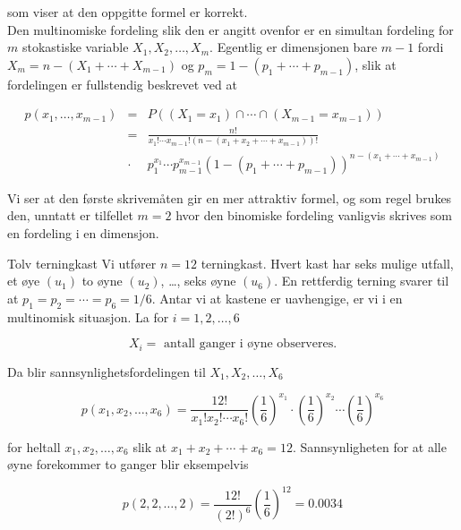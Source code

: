 \noindent som viser at den oppgitte formel er korrekt.\\

 Den multinomiske fordeling slik den er angitt
ovenfor er en simultan fordeling for $m$ stokastiske variable
$X_1, X_2, \ldots, X_m$. Egentlig er dimensjonen bare $m-1$ fordi
$X_m=n-(X_1+\cdots +X_{m-1})$ og $p_m=1-(p_1+\cdots +p_{m-1})$,
slik at fordelingen er fullstendig beskrevet ved at

\begin{eqnarray*}
 p(x_1,\ldots ,x_{m-1})&=&P((X_1=x_1)\cap \cdots \cap (X_{m-1}=x_{m-1})) \\
&=&\frac{n!}{x_1!\cdots x_{m-1}!(n-(x_1+x_2+\cdots +x_{m-1}))!} \\
& \cdot & p_1^{x_1}\cdots p_{m-1}^{x_{m-1}}{(1-(p_1+\cdots +p_{m-1}))}^{n-(x_1+\cdots +x_{m-1})}
\end{eqnarray*}

\noindent Vi ser at den første skrivemåten gir en mer attraktiv formel,
og som regel brukes den, unntatt er tilfellet $m=2$ hvor den
binomiske fordeling vanligvis skrives som en fordeling i en
dimensjon.\\

\begin{eksempel}{Tolv terningkast}
Vi utfører $n=12$ terningkast. Hvert kast har seks mulige utfall,
et øye $(u_1)$ to øyne $(u_2)$, \ldots, seks øyne $(u_6)$. En
rettferdig terning svarer til at $p_1=p_2=\cdots =p_6=1/6$. Antar
vi at kastene er uavhengige, er vi i en multinomisk situasjon. La
for $i=1, 2, \ldots, 6$

\[ X_i= \mbox{\ \ antall ganger i øyne observeres.} \]

\noindent Da blir sannsynlighetsfordelingen til $X_1, X_2, \ldots, X_6$

\[ p(x_1,x_2,\ldots ,x_6)=\frac{12!}{x_1!x_2!\cdots x_6!}
 {(\frac{1}{6})}^{x_1}\cdot {(\frac{1}{6})}^{x_2}\cdots {(\frac{1}{6})}^{x_6}\]

\noindent for heltall $x_1, x_2, \ldots, x_6$ slik at $x_1+x_2+\cdots+x_6=12$.
Sannsynligheten for at alle øyne forekommer to ganger blir
eksempelvis

\[ p(2,2,\ldots ,2)=\frac{12!}{{(2!)}^6}{(\frac{1}{6})}^{12}=0.0034 \]
\end{eksempel}

